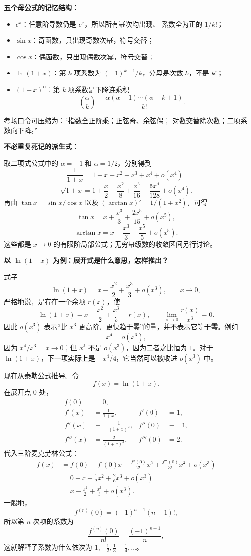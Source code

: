 \begin{knowledgeBox}
\textbf{五个母公式的记忆结构：}
\begin{itemize}
  \item \(e^x\)：任意阶导数仍是 \(e^x\)，所以所有幂次均出现、
  系数全为正的 \(1/k!\)；
  \item \(\sin x\)：奇函数，只出现奇数次幂，符号交替；
  \item \(\cos x\)：偶函数，只出现偶数次幂，符号交替；
  \item \(\ln(1+x)\)：第 \(k\) 项系数为
  \((-1)^{k-1}/k\)，分母是次数 \(k\)，不是 \(k!\)；
  \item \((1+x)^\alpha\)：第 \(k\) 项系数是下降连乘积
  \[
  \binom{\alpha}{k}
  =\frac{\alpha(\alpha-1)\cdots(\alpha-k+1)}{k!}.
  \]
\end{itemize}
考场口令可压缩为：“指数全正阶乘；正弦奇、余弦偶；
对数交替除次数；二项系数向下降。”

\textbf{不必重复死记的派生式：}

取二项式公式中的 \(\alpha=-1\) 和 \(\alpha=1/2\)，分别得到
\[
\frac1{1+x}=1-x+x^2-x^3+x^4+o(x^4),
\]
\[
\sqrt{1+x}
=1+\frac{x}{2}-\frac{x^2}{8}
+\frac{x^3}{16}-\frac{5x^4}{128}+o(x^4).
\]
再由 \(\tan x=\sin x/\cos x\) 以及
\((\arctan x)'=1/(1+x^2)\)，可得
\[
\tan x=x+\frac{x^3}{3}+\frac{2x^5}{15}+o(x^5),
\]
\[
\arctan x=x-\frac{x^3}{3}+\frac{x^5}{5}+o(x^5).
\]
这些都是 \(x\to0\) 的有限阶局部公式；无穷幂级数的收敛区间另行讨论。

\textbf{以 \(\ln(1+x)\) 为例：展开式是什么意思，怎样推出？}

式子
\[
\ln(1+x)=x-\frac{x^2}{2}+\frac{x^3}{3}+o(x^3),
\qquad x\to0,
\]
严格地说，是存在一个余项 \(r(x)\)，使
\[
\ln(1+x)=x-\frac{x^2}{2}+\frac{x^3}{3}+r(x),
\qquad
\lim_{x\to0}\frac{r(x)}{x^3}=0.
\]
因此 \(o(x^3)\) 表示“比 \(x^3\) 更高阶、更快趋于零”的量，并不表示它等于零。例如
\[
x^4=o(x^3),
\]
因为 \(x^4/x^3=x\to0\)；但 \(x^3\) 不是 \(o(x^3)\)，因为二者之比恒为 \(1\)。对于 \(\ln(1+x)\)，下一项实际上是 \(-x^4/4\)，它当然可以被收进 \(o(x^3)\) 中。

现在从泰勒公式推导。令
\[
f(x)=\ln(1+x).
\]
在展开点 \(0\) 处，
\[
\begin{aligned}
f(0)&=0,\\
f'(x)&=\frac{1}{1+x},& f'(0)&=1,\\
f''(x)&=-\frac{1}{(1+x)^2},& f''(0)&=-1,\\
f'''(x)&=\frac{2}{(1+x)^3},& f'''(0)&=2.
\end{aligned}
\]
代入三阶麦克劳林公式：
\[
\begin{aligned}
f(x)
&=f(0)+f'(0)x+\frac{f''(0)}{2!}x^2
  +\frac{f'''(0)}{3!}x^3+o(x^3)\\
&=0+x-\frac{1}{2}x^2+\frac{2}{6}x^3+o(x^3)\\
&=x-\frac{x^2}{2}+\frac{x^3}{3}+o(x^3).
\end{aligned}
\]
一般地，
\[
f^{(n)}(0)=(-1)^{n-1}(n-1)!,
\]
所以第 \(n\) 次项的系数为
\[
\frac{f^{(n)}(0)}{n!}=\frac{(-1)^{n-1}}{n},
\]
这就解释了系数为什么依次为 \(1,-\frac12,\frac13,-\frac14,\ldots\)。


\end{knowledgeBox}
